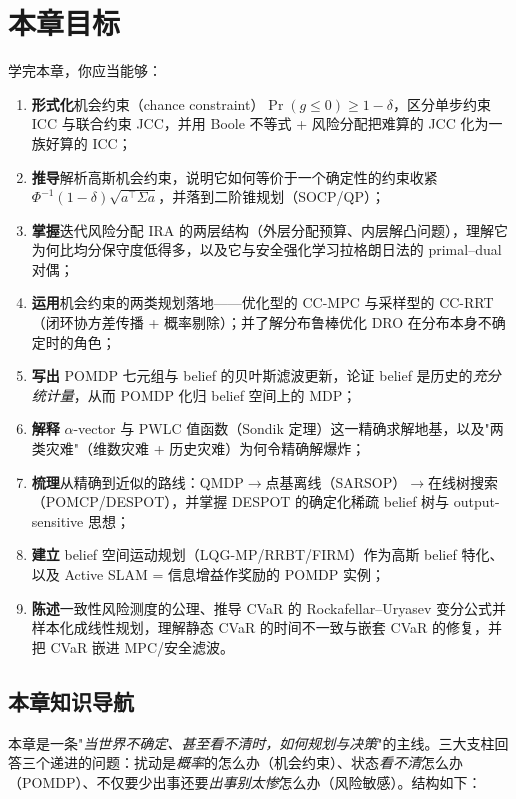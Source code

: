 \section*{本章目标}
学完本章，你应当能够：
\begin{enumerate}
  \item \textbf{形式化}机会约束（chance constraint）$\Pr(g\le 0)\ge 1-\delta$，区分单步约束 ICC 与联合约束 JCC，并用 Boole 不等式 + 风险分配把难算的 JCC 化为一族好算的 ICC；
  \item \textbf{推导}解析高斯机会约束，说明它如何等价于一个确定性的约束收紧 $\Phi^{-1}(1-\delta)\sqrt{a^\top\Sigma a}$，并落到二阶锥规划（SOCP/QP）；
  \item \textbf{掌握}迭代风险分配 IRA 的两层结构（外层分配预算、内层解凸问题），理解它为何比均分保守度低得多，以及它与安全强化学习拉格朗日法的 primal--dual 对偶；
  \item \textbf{运用}机会约束的两类规划落地——优化型的 CC-MPC 与采样型的 CC-RRT（闭环协方差传播 + 概率剔除）；并了解分布鲁棒优化 DRO 在分布本身不确定时的角色；
  \item \textbf{写出} POMDP 七元组与 belief 的贝叶斯滤波更新，论证 belief 是历史的\emph{充分统计量}，从而 POMDP 化归 belief 空间上的 MDP；
  \item \textbf{解释} $\alpha$-vector 与 PWLC 值函数（Sondik 定理）这一精确求解地基，以及"两类灾难"（维数灾难 + 历史灾难）为何令精确解爆炸；
  \item \textbf{梳理}从精确到近似的路线：QMDP$\to$点基离线（SARSOP）$\to$在线树搜索（POMCP/DESPOT），并掌握 DESPOT 的确定化稀疏 belief 树与 output-sensitive 思想；
  \item \textbf{建立} belief 空间运动规划（LQG-MP/RRBT/FIRM）作为高斯 belief 特化、以及 Active SLAM = 信息增益作奖励的 POMDP 实例；
  \item \textbf{陈述}一致性风险测度的公理、推导 CVaR 的 Rockafellar--Uryasev 变分公式并样本化成线性规划，理解静态 CVaR 的时间不一致与嵌套 CVaR 的修复，并把 CVaR 嵌进 MPC/安全滤波。
\end{enumerate}

\subsection*{本章知识导航}
本章是一条"\emph{当世界不确定、甚至看不清时，如何规划与决策}"的主线。三大支柱回答三个递进的问题：扰动是\emph{概率}的怎么办（机会约束）、状态\emph{看不清}怎么办（POMDP）、不仅要少出事还要\emph{出事别太惨}怎么办（风险敏感）。结构如下：

